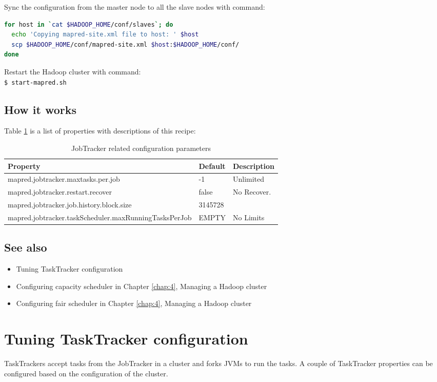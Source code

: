 Sync the configuration from the master node to all the slave nodes with command:
\lstset{style=bashstyle}
\begin{lstlisting}[language=bash]
for host in `cat $HADOOP_HOME/conf/slaves`; do
  echo 'Copying mapred-site.xml file to host: ' $host
  scp $HADOOP_HOME/conf/mapred-site.xml $host:$HADOOP_HOME/conf/
done
\end{lstlisting}


Restart the Hadoop cluster with command: \\
\verb|$ start-mapred.sh|

\subsection*{How it works}
Table \ref{tbl:jobtracker} is a list of properties with descriptions of this recipe:
\begin{table}[ht]
  \centering
  \begin{tabular}{lll}
    \toprule
    \textbf{Property} & \textbf{Default} & \textbf{Description} \\ \midrule
    mapred.jobtracker.maxtasks.per.job & -1 & Unlimited \\
    mapred.jobtracker.restart.recover & false & No Recover. \\
    mapred.jobtracker.job.history.block.size & 3145728 & \\
    mapred.jobtracker.taskScheduler.maxRunningTasksPerJob & EMPTY & No Limits \\ \bottomrule
  \end{tabular}
  \caption{JobTracker related configuration parameters}\label{tbl:jobtracker}
\end{table}

\subsection*{See also}
\begin{itemize}
  \item Tuning TaskTracker configuration
  \item Configuring capacity scheduler in Chapter \ref{chap:4}, Managing a Hadoop cluster
  \item Configuring fair scheduler in Chapter \ref{chap:4}, Managing a Hadoop cluster
\end{itemize}
\section{Tuning TaskTracker configuration}
TaskTrackers accept tasks from the JobTracker in a cluster and forks JVMs to run the tasks. A couple of TaskTracker properties can be configured based on the configuration of the cluster.

